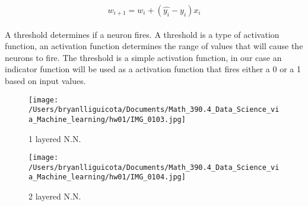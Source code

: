 \documentclass[12pt]{article}
\begin{document}
\begin{enumerate}
$$w_{i+1} = w_{i}+(\hat{y_{i}}- y_{i})x_{i}$$
\\A threshold determines if a neuron fires. A threshold is a type of activation function,  an activation function determines the range of values that will cause the neurons to fire. The threshold is a simple activation function, in our case an indicator function  will be used as a activation function that fires either a 0 or a 1 based on input values.
\begin{figure}[h!]
  \texttt{[image: /Users/bryanlliguicota/Documents/Math\_390.4\_Data\_Science\_via\_Machine\_learning/hw01/IMG\_0103.jpg]}
  \caption{1 layered N.N.}
  \label{fig:boat1}
\end{figure}


\begin{figure}[h!]
  \texttt{[image: /Users/bryanlliguicota/Documents/Math\_390.4\_Data\_Science\_via\_Machine\_learning/hw01/IMG\_0104.jpg]}
  \caption{2 layered N.N.}
  \label{fig:boat1}
\end{figure}
\end{enumerate}
\end{document}
